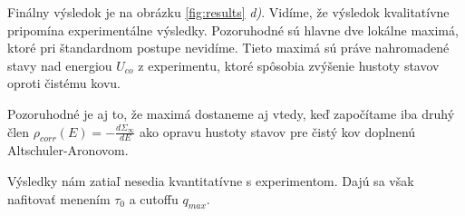 Finálny výsledok je na obrázku \ref{fig:results} {\it d)}. Vidíme, že výsledok kvalitatívne pripomína experimentálne výsledky. Pozoruhodné sú hlavne dve lokálne maximá, ktoré pri štandardnom postupe nevidíme. Tieto maximá sú práve nahromadené stavy nad energiou $U_{co}$ z experimentu, ktoré spôsobia zvýšenie hustoty stavov oproti čistému kovu. 

Pozoruhodné je aj to, že maximá dostaneme aj vtedy, keď započítame iba druhý člen  $\rho_{corr}(E)=-\frac{d\Sigma_{\infty}}{dE}$ ako opravu hustoty stavov pre čistý kov doplnenú Altschuler-Aronovom.

Výsledky nám zatiaľ nesedia kvantitatívne s experimentom. Dajú sa však nafitovať menením $\tau_0$ a cutoffu $q_{max}$.
